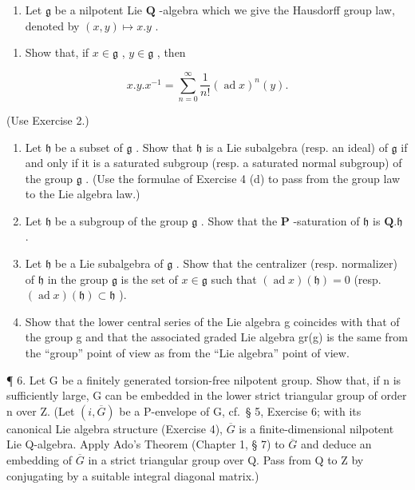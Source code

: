 \begin{enumerate}
\def\labelenumi{\arabic{enumi}.}
\setcounter{enumi}{4}
\tightlist
\item
  Let \(\mathfrak{g}\) be a nilpotent Lie \(\mathbf{Q}\) -algebra which we give the Hausdorff group law, denoted by \((x,y)\mapsto x.y\) .
\end{enumerate}

\begin{enumerate}
\def\labelenumi{(\alph{enumi})}
\tightlist
\item
  Show that, if \(x \in \mathfrak{g}\) , \(y \in \mathfrak{g}\) , then
\end{enumerate}

\[
x. y. x ^ {- 1} = \sum_ {n = 0} ^ {\infty} \frac {1}{n !} (\operatorname{ad} x) ^ {n} (y).
\]

(Use Exercise 2.)

\begin{enumerate}
\def\labelenumi{(\alph{enumi})}
\setcounter{enumi}{1}
\item
  Let \(\mathfrak{h}\) be a subset of \(\mathfrak{g}\) . Show that \(\mathfrak{h}\) is a Lie subalgebra (resp. an ideal) of \(\mathfrak{g}\) if and only if it is a saturated subgroup (resp. a saturated normal subgroup) of the group \(\mathfrak{g}\) . (Use the formulae of Exercise 4 (d) to pass from the group law to the Lie algebra law.)
\item
  Let \(\mathfrak{h}\) be a subgroup of the group \(\mathfrak{g}\) . Show that the \(\mathbf{P}\) -saturation of \(\mathfrak{h}\) is \(\mathbf{Q}.\mathfrak{h}\) .
\item
  Let \(\mathfrak{h}\) be a Lie subalgebra of \(\mathfrak{g}\) . Show that the centralizer (resp. normalizer) of \(\mathfrak{h}\) in the group \(\mathfrak{g}\) is the set of \(x \in \mathfrak{g}\) such that \((\operatorname{ad} x)(\mathfrak{h}) = 0\) (resp. \((\operatorname{ad} x)(\mathfrak{h}) \subset \mathfrak{h}\) ).
\item
  Show that the lower central series of the Lie algebra g coincides with that of the group g and that the associated graded Lie algebra gr(g) is the same from the ``group'' point of view as from the ``Lie algebra'' point of view.
\end{enumerate}

¶ 6. Let G be a finitely generated torsion-free nilpotent group. Show that, if n is sufficiently large, G can be embedded in the lower strict triangular group of order n over Z. (Let \((i, \overline{G})\) be a P-envelope of G, cf.~§ 5, Exercise 6; with its canonical Lie algebra structure (Exercise 4), \(\overline{G}\) is a finite-dimensional nilpotent Lie Q-algebra. Apply Ado's Theorem (Chapter 1, § 7) to \(\overline{G}\) and deduce an embedding of \(\overline{G}\) in a strict triangular group over Q. Pass from Q to Z by conjugating by a suitable integral diagonal matrix.)

